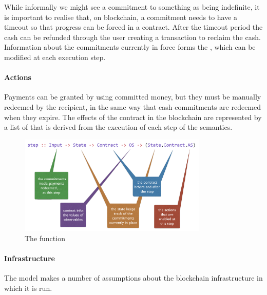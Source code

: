 \documentclass[runningheads]{llncs}
\begin{document}


While informally we might see a commitment to something as being indefinite, it is important to realise that, on
blockchain, a commitment needs to have a timeout so that progress can be forced in a contract. After the timeout period the 
cash can be refunded through the user creating a transaction to reclaim the cash.
Information about the commitments currently in force forms the , which can be  modified 
at each execution step. 

\paragraph{Actions}

Payments can be granted by using committed money, but they must be manually redeemed by the recipient, in the 
same way that cash commitments are redeemed when they expire. The effects of the contract in the blockchain are 
represented by a list  of  that is derived from the execution of each step of 
the semantics.

\begin{figure}[t]
\begin{center}
\includegraphics[width=0.8\textwidth]{pix/step-type.png}
\caption{The  function}
\label{fig:step-function}
\end{center}
\vspace*{-8mm}
\end{figure}

\paragraph{Infrastructure}

The model makes a number of assumptions about the blockchain infrastructure in which it is run.
\end{document}
